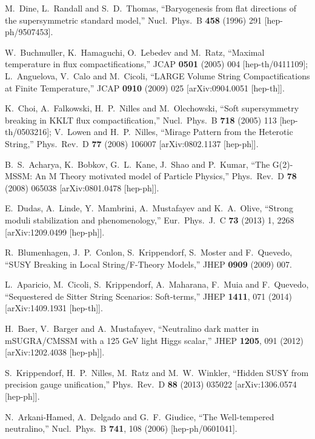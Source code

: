 \documentclass[11pt,a4paper]{article}
\begin{document}
\begin{thebibliography}{99}
 M.~Dine, L.~Randall and S.~D.~Thomas,
 ``Baryogenesis from flat directions of the supersymmetric standard model,''
  Nucl.\ Phys.\ B {\bf 458} (1996) 291
  [hep-ph/9507453].

W.~Buchmuller, K.~Hamaguchi, O.~Lebedev and M.~Ratz,
  ``Maximal temperature in flux compactifications,''
  JCAP {\bf 0501} (2005) 004
  [hep-th/0411109];
L.~Anguelova, V.~Calo and M.~Cicoli,
  ``LARGE Volume String Compactifications at Finite Temperature,''
  JCAP {\bf 0910} (2009) 025
  [arXiv:0904.0051 [hep-th]].

K.~Choi, A.~Falkowski, H.~P.~Nilles and M.~Olechowski,
  ``Soft supersymmetry breaking in KKLT flux compactification,''
  Nucl.\ Phys.\ B {\bf 718} (2005) 113
  [hep-th/0503216];   
V.~Lowen and H.~P.~Nilles,
  ``Mirage Pattern from the Heterotic String,''
  Phys.\ Rev.\ D {\bf 77} (2008) 106007
  [arXiv:0802.1137 [hep-ph]].

B.~S.~Acharya, K.~Bobkov, G.~L.~Kane, J.~Shao and P.~Kumar,
  ``The G(2)-MSSM: An M Theory motivated model of Particle Physics,''
  Phys.\ Rev.\ D {\bf 78} (2008) 065038
  [arXiv:0801.0478 [hep-ph]].

  E.~Dudas, A.~Linde, Y.~Mambrini, A.~Mustafayev and K.~A.~Olive,
  ``Strong moduli stabilization and phenomenology,''
  Eur.\ Phys.\ J.\ C {\bf 73} (2013) 1,  2268
  [arXiv:1209.0499 [hep-ph]].

R.~Blumenhagen, J.~P.~Conlon, S.~Krippendorf, S.~Moster and F.~Quevedo,
  ``SUSY Breaking in Local String/F-Theory Models,''
  JHEP {\bf 0909} (2009) 007.

L.~Aparicio, M.~Cicoli, S.~Krippendorf, A.~Maharana, F.~Muia and F.~Quevedo,
  ``Sequestered de Sitter String Scenarios: Soft-terms,''
  JHEP {\bf 1411}, 071 (2014)
  [arXiv:1409.1931 [hep-th]].

H.~Baer, V.~Barger and A.~Mustafayev,
  ``Neutralino dark matter in mSUGRA/CMSSM with a 125 GeV light Higgs scalar,''
  JHEP {\bf 1205}, 091 (2012)
  [arXiv:1202.4038 [hep-ph]].

  S.~Krippendorf, H.~P.~Nilles, M.~Ratz and M.~W.~Winkler,
  ``Hidden SUSY from precision gauge unification,''
  Phys.\ Rev.\ D {\bf 88} (2013) 035022
  [arXiv:1306.0574 [hep-ph]].

N.~Arkani-Hamed, A.~Delgado and G.~F.~Giudice,
  ``The Well-tempered neutralino,''
  Nucl.\ Phys.\ B {\bf 741}, 108 (2006)
  [hep-ph/0601041].


\end{thebibliography}
\end{document}
